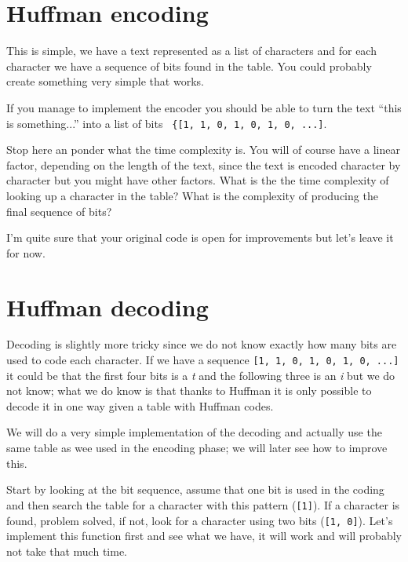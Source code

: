 \documentclass[a4paper,11pt]{article}
\begin{document}

\section{Huffman encoding}

This is simple, we have a text represented as a list of characters and
for each character we have a sequence of bits found in the table. You
could probably create something very simple that works.

If you manage to implement the encoder you should be able to turn the
text ``this is something...'' into a list of bits {\tt
  \{[1, 1, 0, 1, 0, 1, 0, ...]}.

Stop here an ponder what the time complexity is. You will of course
have a linear factor, depending on the length of the text, since the
text is encoded character by character but you might have other
factors. What is the the time complexity of looking up a character in
the table? What is the complexity of producing the final sequence of bits?

I'm quite sure that your original code is open for improvements but
let's leave it for now.



\section{Huffman decoding}

Decoding is slightly more tricky since we do not know exactly how many
bits are used to code each character. If we have a sequence
{\tt [1, 1, 0, 1, 0, 1, 0, ...]} it could be that the first four bits is a
{\em t} and the following three is an {\em i} but we do not know;
what we do know is that thanks to Huffman it is only possible to
decode it in one way given a table with Huffman codes.

We will do a very simple implementation of the decoding and actually
use the same table as wee used in the encoding phase; we will later see
how to improve this. 

Start by looking at the bit sequence, assume that one bit is used in the coding and then
search the table for a character with this pattern ({\tt [1]}). If
a character is found, problem solved, if not, look for a character
using two bits ({\tt [1, 0]}). Let's implement this function first
and see what we have, it will work and will probably not take that much time.
\end{document}
